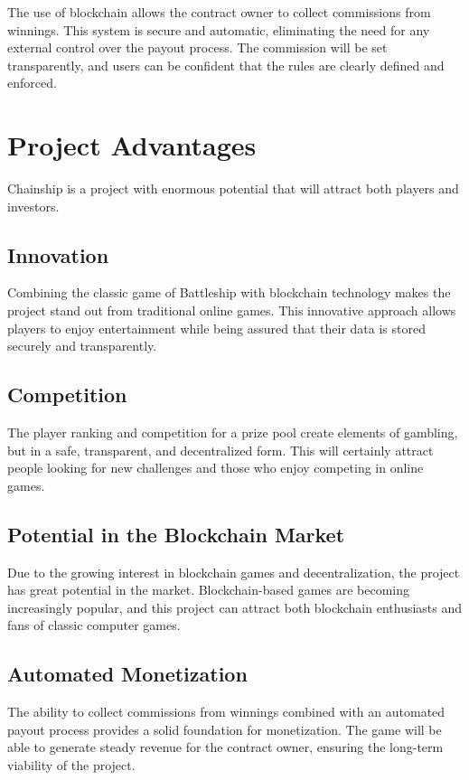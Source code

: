 \documentclass{article}
\begin{document}
The use of blockchain allows the contract owner to collect commissions from winnings. This system is secure and automatic, eliminating the need for any external control over the payout process. The commission will be set transparently, and users can be confident that the rules are clearly defined and enforced.

\section{Project Advantages}

Chainship is a project with enormous potential that will attract both players and investors.

\subsection{Innovation}

Combining the classic game of Battleship with blockchain technology makes the project stand out from traditional online games. This innovative approach allows players to enjoy entertainment while being assured that their data is stored securely and transparently.

\subsection{Competition}

The player ranking and competition for a prize pool create elements of gambling, but in a safe, transparent, and decentralized form. This will certainly attract people looking for new challenges and those who enjoy competing in online games.

\subsection{Potential in the Blockchain Market}

Due to the growing interest in blockchain games and decentralization, the project has great potential in the market. Blockchain-based games are becoming increasingly popular, and this project can attract both blockchain enthusiasts and fans of classic computer games.

\subsection{Automated Monetization}

The ability to collect commissions from winnings combined with an automated payout process provides a solid foundation for monetization. The game will be able to generate steady revenue for the contract owner, ensuring the long-term viability of the project.
\end{document}
